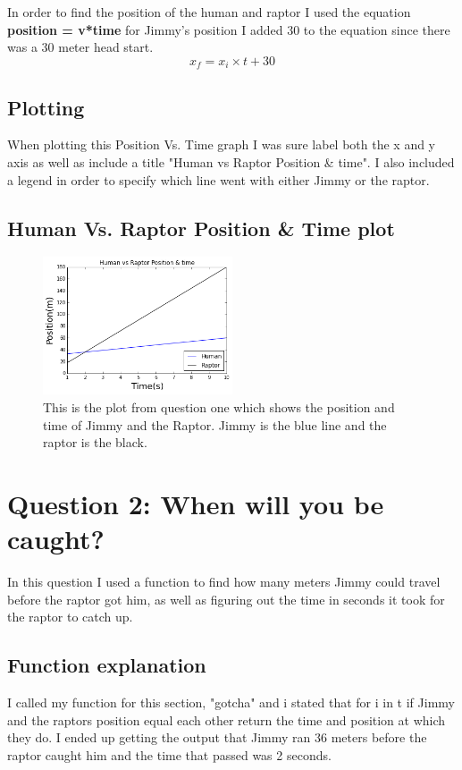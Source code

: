 \documentclass[twocolumn]{revtex4}
\begin{document}
In order to find the position of the human and raptor I used the equation \textbf{position = v*time} for Jimmy's position I added 30 to the equation since there was a 30 meter head start.$$x_f = x_i \times t + 30 $$ 

\subsection{Plotting}
When plotting this Position Vs. Time graph I was sure label both the x and y axis as well as include a title "Human vs Raptor Position \& time". I also included a legend in order to specify which line went with either Jimmy or the raptor.


\subsection{Human Vs. Raptor Position \& Time plot}
\begin{figure}
\includegraphics[width=0.5\textwidth]{Jimmy_Graph.png}
\caption {This is the plot from question one which shows the 	position and time of Jimmy and the Raptor. Jimmy is the blue line and the raptor is the black.}
\label{fig:Position vs. Time}
\end{figure}


\section{Question 2: When will you be caught?}

In this question I used a function to find how many meters Jimmy could travel before the raptor got him, as well as figuring out the time in seconds it took for the raptor to catch up. 

\subsection{Function explanation}

I called my function for this section, "gotcha" and i stated that for i in t if Jimmy and the raptors position equal each other return the time and position at which they do. I ended up getting the output that Jimmy ran 36 meters before the raptor caught him and the time that passed was 2 seconds. 
\end{document}
